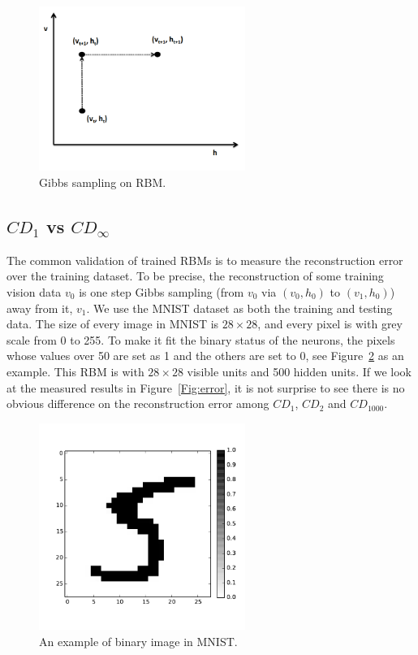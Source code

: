 	\begin{figure}[hbt]
		\centering
		\includegraphics[width=0.6\textwidth]{pics_sdbn/gibbs.png}
		\caption{Gibbs sampling on RBM.}
		\label{fig:gibbs}
	\end{figure}	
\subsection{$CD_1$ vs $CD_{\infty}$}
\label{sec:cd1}
The common validation of trained RBMs is to measure the reconstruction error over the training dataset.
To be precise, the reconstruction of some training vision data $ v_0 $ is one step Gibbs sampling (from $ v_0 $ via $ (v_0, h_0 )$ to $ (v_1, h_0 )$) away from it, $ v_1 $.
We use the MNIST dataset as both the training and testing data.
The size of every image in MNIST is $28 \times 28$, and every pixel is with grey scale from 0 to 255.
To make it fit the binary status of the neurons, the pixels whose values over 50 are set as 1 and the others are set to 0, see Figure~\ref{Fig:5} as an example.
This RBM is with $28 \times 28$ visible units and 500 hidden units.
If we look at the measured results in Figure~\ref{Fig:error}, it is not surprise to see there is no obvious difference on the reconstruction error among $CD_1$, $CD_2$ and $CD_{1000}$.

	\begin{figure}[hbt]
		\centering
		\includegraphics[width=0.6\textwidth]{pics_sdbn/test.pdf}
		\caption{An example of binary image in MNIST.}
		\label{Fig:5}
	\end{figure}

